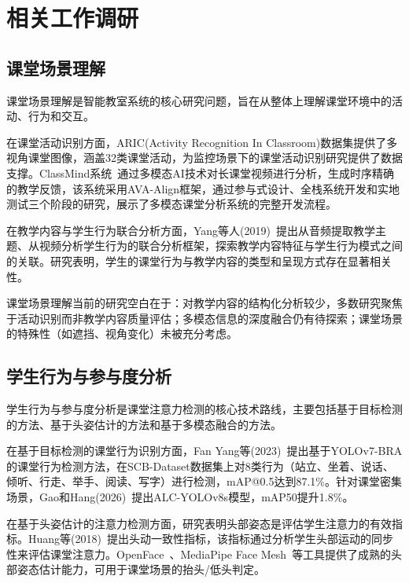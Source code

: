 \documentclass[12pt,hyperref,a4paper,UTF8]{ctexart}
\begin{document}
\section{相关工作调研}

\subsection{课堂场景理解}

课堂场景理解是智能教室系统的核心研究问题，旨在从整体上理解课堂环境中的活动、行为和交互。

在课堂活动识别方面，ARIC(Activity Recognition In Classroom)数据集提供了多视角课堂图像，涵盖32类课堂活动，为监控场景下的课堂活动识别研究提供了数据支撑。ClassMind系统~\cite{classmind2025}通过多模态AI技术对长课堂视频进行分析，生成时序精确的教学反馈，该系统采用AVA-Align框架，通过参与式设计、全栈系统开发和实地测试三个阶段的研究，展示了多模态课堂分析系统的完整开发流程。

在教学内容与学生行为联合分析方面，Yang等人(2019)~\cite{yang2019classroom}提出从音频提取教学主题、从视频分析学生行为的联合分析框架，探索教学内容特征与学生行为模式之间的关联。研究表明，学生的课堂行为与教学内容的类型和呈现方式存在显著相关性。

课堂场景理解当前的研究空白在于：对教学内容的结构化分析较少，多数研究聚焦于活动识别而非教学内容质量评估；多模态信息的深度融合仍有待探索；课堂场景的特殊性（如遮挡、视角变化）未被充分考虑。

\subsection{学生行为与参与度分析}

学生行为与参与度分析是课堂注意力检测的核心技术路线，主要包括基于目标检测的方法、基于头姿估计的方法和基于多模态融合的方法。

在基于目标检测的课堂行为识别方面，Fan Yang等(2023)~\cite{fan2023yolov7}提出基于YOLOv7-BRA的课堂行为检测方法，在SCB-Dataset数据集上对8类行为（站立、坐着、说话、倾听、行走、举手、阅读、写字）进行检测，mAP@0.5达到87.1\%。针对课堂密集场景，Gao和Hang(2026)~\cite{gao2026}提出ALC-YOLOv8s模型，mAP50提升1.8\%。

在基于头姿估计的注意力检测方面，研究表明头部姿态是评估学生注意力的有效指标。Huang等(2018)~\cite{acm2018attention}提出头动一致性指标，该指标通过分析学生头部运动的同步性来评估课堂注意力。OpenFace~\cite{openface2020}、MediaPipe Face Mesh~\cite{mediapipe2020}等工具提供了成熟的头部姿态估计能力，可用于课堂场景的抬头/低头判定。
\end{document}
